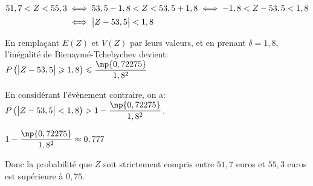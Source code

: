 \begin{enumerate}[resume]
$\begin{aligned}
51,7 < Z < 55,3 & \iff 53,5-1,8 < Z < 53,5+1,8 \iff -1,8 < Z - 53,5 < 1,8 \\
 & \iff \left | Z-53,5 \strut \right | <1,8
 \end{aligned}$

En remplaçant $E(Z)$ et $V(Z)$ par leurs valeurs, et en prenant $\delta=1,8$, l'inégalité de Bienaymé-Tchebychev devient:
$P\left ( \left |Z-53,5\strut \right | \geqslant 1,8 \right ) \leqslant \dfrac{\np{0,72275}}{1,8^2}$

En considérant l'évènement contraire, on a:
$P\left ( \left |Z-53,5\strut \right | < 1,8 \right ) > 1-  \dfrac{\np{0,72275}}{1,8^2}$.

$1- \dfrac{\np{0,72275}}{1,8^2} \approx 0,777$

Donc la probabilité que $Z$ soit strictement compris entre $51,7$ euros et $55,3$ euros est supérieure à $0,75$.
\end{enumerate}
%
%
%
%

\bigskip

